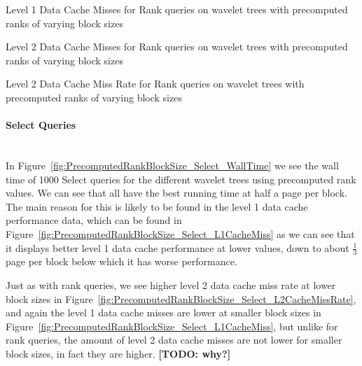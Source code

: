 \figureBegin
\caption{Level 1 Data Cache Misses for Rank queries on wavelet trees with precomputed ranks of varying block sizes}
\label{fig:PrecomputedRankBlockSize_Rank_L1CacheMiss}

\figureEnd


\figureBegin
\caption{Level 2 Data Cache Misses for Rank queries on wavelet trees with precomputed ranks of varying block sizes}
\label{fig:PrecomputedRankBlockSize_Rank_L2CacheMiss}

\figureEnd


\figureBegin
\caption{Level 2 Data Cache Miss Rate for Rank queries on wavelet trees with precomputed ranks of varying block sizes}
\label{fig:PrecomputedRankBlockSize_Rank_L2CacheMissRate}

\figureEnd


%




\clearpage



\paragraph{Select Queries}~\\
In Figure~\ref{fig:PrecomputedRankBlockSize_Select_WallTime} we see the wall time of 1000 Select queries for the different wavelet trees using precomputed rank values.
We can see that all have the best running time at half a page per block.
The main reason for this is likely to be found in the level 1 data cache performance data, which can be found in Figure~\ref{fig:PrecomputedRankBlockSize_Select_L1CacheMiss} as we can see that it displays better level 1 data cache performance at lower values, down to about $\frac{1}{3}$ page per block below which it has worse performance.

Just as with rank queries, we see higher level 2 data cache miss rate at lower block sizes in Figure~\ref{fig:PrecomputedRankBlockSize_Select_L2CacheMissRate}, and again the level 1 data cache misses are lower at smaller block sizes in Figure~\ref{fig:PrecomputedRankBlockSize_Select_L1CacheMiss}, but unlike for rank queries, the amount of level 2 data cache misses are not lower for smaller block sizes, in fact they are higher.
\textbf{[TODO: why?]}

